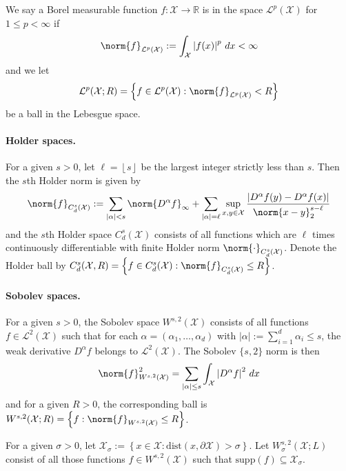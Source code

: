 \documentclass{article}
\newcommand{\Reals}{\mathbb{R}}
\newcommand{\abs}[1]{\left \lvert #1 \right \rvert}
\newcommand{\set}[1]{\left\{#1\right\}}
\newcommand{\floor}[1]{\left\lfloor #1 \right\rfloor}
\newcommand{\1}{\mathbf{1}}
\newcommand{\Xset}{\mathcal{X}}
\newcommand{\Leb}{\mathcal{L}}
\theoremstyle{alden}
\theoremstyle{aldenthm}
\theoremstyle{definition}
\theoremstyle{remark}
\begin{document}
We say a Borel measurable function $f: \mathcal{X} \to \Reals$ is in the space $\mathcal{L}^p(\mathcal{X})$ for $1 \leq p < \infty$ if 
$$\norm{f}_{\mathcal{L}^p(\mathcal{X})} := \int_{\mathcal{X}} \abs{f(x)}^p \,dx < \infty$$
and we let 
\begin{equation*}
\mathcal{L}^p(\mathcal{X};R) = \set{f \in \mathcal{L}^p(\mathcal{X}): \norm{f}_{\mathcal{L}^p(\mathcal{X})} < R}
\end{equation*}
be a ball in the Lebesgue space.


\paragraph{Holder spaces.}

For a given $s > 0$, let $\ell = \floor{s}$ be the largest integer strictly less than $s$. Then the $s$th Holder norm is given by
\begin{equation*}
\norm{f}_{C_d^{s}(\mathcal{X})} := \sum_{\abs{\alpha} < s} \norm{D^{\alpha}f}_{\infty} + \sum_{\abs{\alpha} = \ell} \sup_{x,y \in \mathcal{X}} \frac{\abs{D^{\alpha}f(y) - D^{\alpha}f(x)}}{\norm{x - y}_2^{s - \ell}}
\end{equation*}
and the $s$th Holder space $C_d^{s}(\mathcal{X})$ consists of all functions which are $\ell$ times continuously differentiable with finite Holder norm $\norm{\cdot}_{C_d^{s}(\mathcal{X})}$. Denote the Holder ball by $C_d^{s}(\mathcal{X},R) = \set{f \in C_d^{s}(\mathcal{X}): \norm{f}_{C_d^{s}(\mathcal{X})} \leq R}$.

\paragraph{Sobolev spaces.}

For a given $s > 0$, the Sobolev space $W^{s,2}(\mathcal{X})$ consists of all functions $f \in \Leb^2(\mathcal{X})$ such that for each $\alpha = (\alpha_1,\ldots,\alpha_d)$ with $\abs{\alpha} := \sum_{i = 1}^{d} \alpha_i \leq s$, the weak derivative $D^{\alpha}f$ belongs to $\mathcal{L}^2(\mathcal{X})$. The Sobolev $\{s,2\}$ norm is then 
\begin{equation*}
\norm{f}_{W^{s,2}(\mathcal{X})}^2 = \sum_{\abs{\alpha} \leq s} \int_{\mathcal{X}} \abs{D^{\alpha}f}^2 \,dx
\end{equation*}
and for a given $R > 0$, the corresponding ball is $W^{s,2}(\Xset; R) = \set{f: \norm{f}_{W^{s,2}(\Xset)} \leq R}$.

For a given $\sigma > 0$, let $\Xset_{\sigma} := \set{x \in \Xset: \mathrm{dist}(x,\partial\Xset) > \sigma}$. Let $W_{\sigma}^{s,2}(\Xset;L)$ consist of all those functions $f \in W^{s,2}(\Xset)$ such that $\mathrm{supp}(f) \subseteq \Xset_{\sigma}$.
\end{document}
